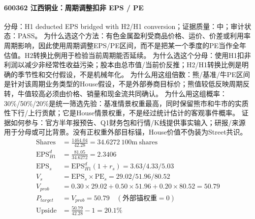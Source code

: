 \paragraph{600362 江西铜业：周期调整扣非 EPS / PE}
分母：H1 deducted EPS bridged with H2/H1 conversion；证据质量：中；审计状态：PASS。
为什么选这个方法：有色金属盈利受商品价格、运价、价差或利用率周期影响，因此使用周期调整EPS/PE区间，而不是把某一个季度的PE当作全年估值。H2转换比例用于检验当前周期能否延续。
为什么选这个分母：使用H1扣非利润以减少非经常性收益污染；股本由总市值/当前价反推；H2/H1转换比例是明确的季节性和交付假设，不是机械年化。
为什么用这组倍数：熊/基准/牛PE区间是针对该周期业务类型的House假设，不是外部券商目标价；熊值较低反映周期反转，牛值较高必须由价格、销量和现金流共同确认。
为什么用这组概率：30\%/50\%/20\%是统一筛选先验：基准情景权重最高，同时保留熊市和牛市的实质性下行/上行贡献；它是House情景权重，不是经过统计估计的客观事件概率。
证据如何参与：官方半年报预告、Q1财务包和行情/K线提供事实输入；研报/来源用于分母或可比背景。没有正权重外部目标锚，House价值不伪装为Street共识。
\begin{align*}
\mathrm{Shares} &= \frac{1464.04}{42.28}=34.6272\ \mathrm{100m\ shares}\\
\mathrm{EPS}_{H1}^d &= \frac{81.05}{34.6272}=2.3406\\
\mathrm{EPS}_s &= \mathrm{EPS}_{H1}^d(1+r_s)=3.63/4.33/5.03\\
V_s &= \mathrm{EPS}_s\times \mathrm{PE}_s=29.02/51.96/80.52\\
V_{prob} &= 0.30\times 29.02+0.50\times 51.96+0.20\times 80.52=50.79\\
P_{target} &= V_{prob}=50.79\quad(\text{外部锚权重}=0)\\
\mathrm{Upside} &= \frac{50.79}{42.28}-1=20.1\%\\
\end{align*}

